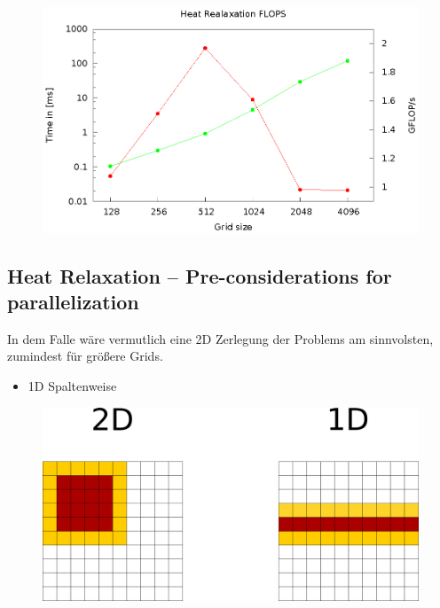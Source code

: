 \documentclass[a4paper,11pt]{scrartcl}
\begin{document}
\begin{figure}[htbp]
\includegraphics[width=\linewidth,
keepaspectratio]{plot.eps}
\centering
\end{figure}

\subsection{Heat Relaxation – Pre-considerations for parallelization}

In dem Falle wäre vermutlich eine 2D Zerlegung der Problems am sinnvolsten, zumindest für größere Grids.
\begin{itemize}
    \item 1D Spaltenweise 

\end{itemize}

\begin{figure}[htbp]
\includegraphics[width=0.7\linewidth,
keepaspectratio]{decomp.png}
\centering
\end{figure}
\end{document}
